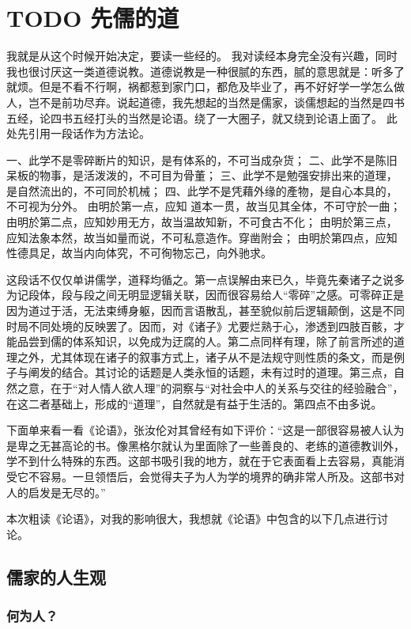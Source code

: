 \documentclass[10pt,a4paper]{article}
\begin{document}
\section{{\bfseries\sffamily TODO} 先儒的道}
\label{sec:org4cea57d}
我就是从这个时候开始决定，要读一些经的。
我对读经本身完全没有兴趣，同时我也很讨厌这一类道德说教。道德说教是一种很腻的东西，腻的意思就是：听多了就烦。但是不看不行啊，祸都惹到家门口，都危及毕业了，再不好好学一学怎么做人，岂不是前功尽弃。说起道德，我先想起的当然是儒家，谈儒想起的当然是四书五经，论四书五经打头的当然是论语。绕了一大圈子，就又绕到论语上面了。
此处先引用一段话作为方法论。

一、此学不是零碎断片的知识，是有体系的，不可当成杂货；
二、此学不是陈旧呆板的物事，是活泼泼的，不可目为骨董；
三、此学不是勉强安排出来的道理，是自然流出的，不可同於机械；
四、此学不是凭藉外缘的產物，是自心本具的，不可视为分外。
由明於第一点，应知 道本一贯，故当见其全体，不可守於一曲；
由明於第二点，应知妙用无方，故当温故知新，不可食古不化；
由明於第三点，应知法象本然，故当如量而说，不可私意造作。穿凿附会；
由明於第四点，应知性德具足，故当内向体究，不可徇物忘己，向外驰求。

这段话不仅仅单讲儒学，道释均循之。第一点误解由来已久，毕竟先秦诸子之说多为记段体，段与段之间无明显逻辑关联，因而很容易给人“零碎”之感。可零碎正是因为道过于活，无法束缚身躯，因而言语散乱，甚至貌似前后逻辑颠倒，这是不同时局不同处境的反映罢了。因而，对《诸子》尤要烂熟于心，渗透到四肢百骸，才能品尝到儒的体系知识，以免成为迂腐的人。第二点同样有理，除了前言所述的道理之外，尤其体现在诸子的叙事方式上，诸子从不是法规守则性质的条文，而是例子与阐发的结合。其讨论的话题是人类永恒的话题，未有过时的道理。第三点，自然之意，在于“对人情人欲人理”的洞察与“对社会中人的关系与交往的经验融合”，在这二者基础上，形成的“道理”，自然就是有益于生活的。第四点不由多说。

下面单来看一看《论语》，张汝伦对其曾经有如下评价：“这是一部很容易被人认为是卑之无甚高论的书。像黑格尔就认为里面除了一些善良的、老练的道德教训外，学不到什么特殊的东西。这部书吸引我的地方，就在于它表面看上去容易，真能消受它不容易。一旦领悟后，会觉得夫子为人为学的境界的确非常人所及。这部书对人的启发是无尽的。”

本次粗读《论语》，对我的影响很大，我想就《论语》中包含的以下几点进行讨论。
\subsection{儒家的人生观}
\label{sec:org94d71a6}
\subsubsection{何为人？}
\label{sec:org5e158f3}
\end{document}
